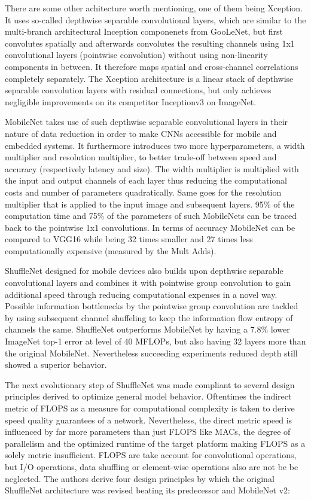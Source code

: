 There are some other achitecture worth mentioning, one of them being Xception. It uses so-called depthwise separable convolutional layers, which are similar to the  multi-branch architectural Inception componenets from GooLeNet, but first convolutes spatially and afterwards convolutes the resulting channels using 1x1 convolutional layers (pointwise convolution) without using non-linearity components in between. It therefore maps spatial and cross-channel correlations completely separately. The Xception architecture is a linear stack of depthwise separable convolution layers with residual connections, but only achieves negligible improvements on its competitor Inceptionv3 on ImageNet. \cite{FrancoisChollet.2017}

MobileNet takes use of such depthwise separable convolutional layers in their nature of data reduction in order to make CNNs accessible for mobile and embedded systems. It furthermore introduces two more hyperparameters, a width multiplier and resolution multiplier, to better trade-off between speed and accuracy (respectively latency and size). The width multiplier is multiplied with the input and output channels of each layer thus reducing the computational costs and number of parameters quadratically. Same goes for the resolution multiplier that is applied to the input image and subsequent layers. 95\% of the computation time and 75\% of the parameters of such MobileNets can be traced back to the pointwise 1x1 convolutions. In terms of accuracy MobileNet can be compared to VGG16 while being 32 times smaller and 27 times less computationally expensive (measured by the Mult Adds). \cite{AndrewGHoward.2017}

ShuffleNet designed for mobile devices also builds upon depthwise separable convolutional layers and combines it with pointwise group convolution to gain additional speed through reducing computational expenses in a novel way. Possible information bottlenecks by the pointwise group convolution are tackled by using subsequent channel shuffeling to keep the information flow entropy of channels the same. ShuffleNet outperforms MobileNet by having a 7.8\% lower ImageNet top-1 error at level of 40 MFLOPs, but also having 32 layers more than the original MobileNet. Nevertheless succeeding experiments reduced depth still showed a superior behavior. \cite{XiangyuZhang.2017}

The next evolutionary step of ShuffleNet was made compliant to several design principles derived to optimize general model behavior. Oftentimes the indirect metric of FLOPS as a measure for computational complexity is taken to derive speed quality guarantees of a network. Nevertheless, the direct metric speed is influenced by far more parameters than just FLOPS like MACs, the degree of parallelism and the optimized runtime of the target platform making FLOPS as a solely metric insufficient. FLOPS are take account for convolutional operations, but I/O operations, data shuffling or element-wise operations also are not be be neglected. The authors derive four design principles by which the original ShuffleNet architecture was revised beating its predecessor and MobileNet v2: \cite{NingningMa.2018}

